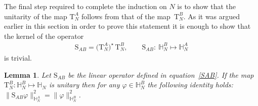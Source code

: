 \documentclass[11pt]{article}
\numberwithin{equation}{section}
\numberwithin{equation}{section}
\newtheorem{Lemma}[Theorem]{Lemma}
\begin{document}
The final step required to complete the induction on $N$ is to show that the unitarity of the map $\mathrm T_N^A$ follows from that
of the map~$\mathrm T_N^B$. As it was argued earlier in this section in order to prove this statement it is enough to show that the kernel of the operator
\begin{gather}\label{SAB}
\mathrm S_{AB}=\big(\mathrm T_N^A\big)^{\star} \,\mathrm T_N^B, \qquad
\mathrm S_{AB}\colon\ \mathbb H_N^B\mapsto \mathbb H_N^A
\end{gather}
is trivial.

\begin{Lemma}
Let $\mathrm S_{AB}$ be the linear operator defined in equation~\eqref{SAB}. If the map $\mathrm T_N^B\colon \mathbb H_N^{B}\mapsto \mathbb H_N$
is unitary then for any $\varphi\in \mathbb H_N^B$ the following identity holds: $\|\mathrm S_{AB}\varphi\|^2_{\mathbb
H_N^{A}}=\|\varphi\|^2_{\mathbb H_N^B}$.
\label{Lemme isometrie operateur SAB}
\end{Lemma}
\end{document}

